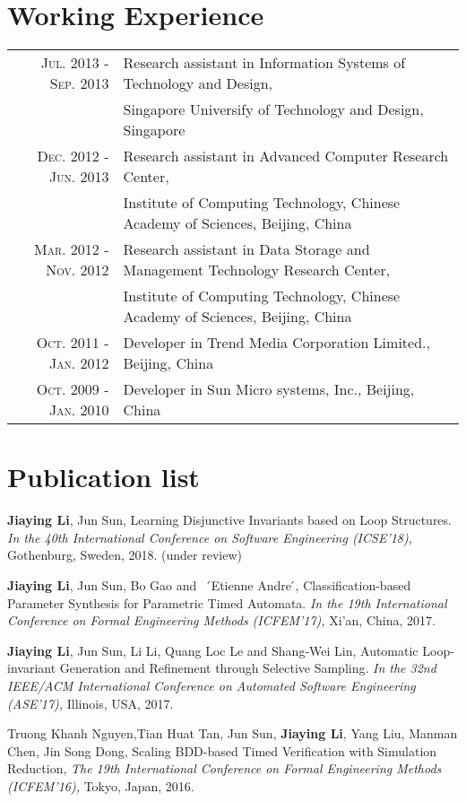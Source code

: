 \documentclass[a4paper,10pt]{article}
\begin{document}
\section{Working Experience}
\begin{tabular}{rl}	
	\textsc{Jul.} 2013 - \textsc{Sep.} 2013  & Research assistant in Information Systems of Technology and Design,\\
		 									 & Singapore Universify of Technology and Design, Singapore \\
	\textsc{Dec.} 2012 - \textsc{Jun.} 2013	 & Research assistant in Advanced Computer Research Center,\\
		 									 & Institute of Computing Technology, Chinese Academy of Sciences, Beijing, China \\
	\textsc{Mar.} 2012 - \textsc{Nov.} 2012  & Research assistant in Data Storage and Management Technology Research Center, \\
											 & Institute of Computing Technology, Chinese Academy of Sciences, Beijing, China \\
	\textsc{Oct.} 2011 - \textsc{Jan.} 2012  & Developer in Trend Media Corporation Limited., Beijing, China\\
	\textsc{Oct.} 2009 - \textsc{Jan.} 2010  & Developer in Sun Micro systems, Inc., Beijing, China\\
\end{tabular}


\section{Publication list}

\textbf{Jiaying Li}, Jun Sun, Learning Disjunctive Invariants based on Loop Structures. {\sl In the 40th International Conference on Software Engineering (ICSE'18),} Gothenburg, Sweden, 2018. (under review)

\textbf{Jiaying Li}, Jun Sun, Bo Gao and ~ ́Etienne Andre ́, Classification-based Parameter Synthesis for Parametric Timed Automata. {\sl In the 19th International Conference on Formal Engineering Methods (ICFEM'17),} Xi'an, China, 2017.

\textbf{Jiaying Li}, Jun Sun, Li Li, Quang Loc Le and Shang-Wei Lin, Automatic Loop-invariant Generation and Refinement through Selective Sampling. {\sl In the 32nd IEEE/ACM International Conference on Automated Software Engineering (ASE'17),} Illinois, USA, 2017.

Truong Khanh Nguyen,Tian Huat Tan, Jun Sun, \textbf{Jiaying Li}, Yang Liu, Manman Chen, Jin Song Dong, Scaling BDD-based Timed Verification with Simulation Reduction, {\sl The 19th International Conference on Formal Engineering Methods (ICFEM'16),} Tokyo, Japan, 2016. 
\end{document}
